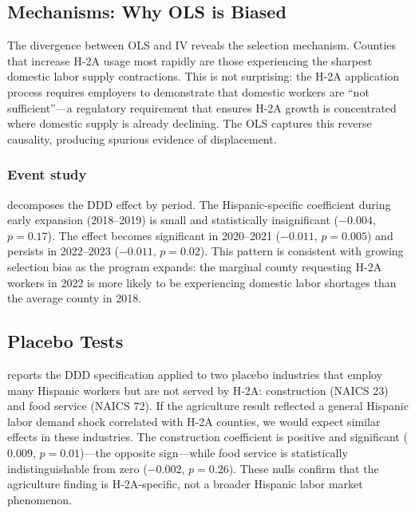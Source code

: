 \documentclass[12pt]{article}
\begin{document}


\subsection{Mechanisms: Why OLS is Biased}

The divergence between OLS and IV reveals the selection mechanism. Counties that increase H-2A usage most rapidly are those experiencing the sharpest domestic labor supply contractions. This is not surprising: the H-2A application process requires employers to demonstrate that domestic workers are ``not sufficient''---a regulatory requirement that ensures H-2A growth is concentrated where domestic supply is already declining. The OLS captures this reverse causality, producing spurious evidence of displacement.

\subsubsection*{Event study}  decomposes the DDD effect by period. The Hispanic-specific coefficient during early expansion (2018--2019) is small and statistically insignificant ($-0.004$, $p = 0.17$). The effect becomes significant in 2020--2021 ($-0.011$, $p = 0.005$) and persists in 2022--2023 ($-0.011$, $p = 0.02$). This pattern is consistent with growing selection bias as the program expands: the marginal county requesting H-2A workers in 2022 is more likely to be experiencing domestic labor shortages than the average county in 2018.



\subsection{Placebo Tests}

 reports the DDD specification applied to two placebo industries that employ many Hispanic workers but are not served by H-2A: construction (NAICS 23) and food service (NAICS 72). If the agriculture result reflected a general Hispanic labor demand shock correlated with H-2A counties, we would expect similar effects in these industries. The construction coefficient is positive and significant ($0.009$, $p = 0.01$)---the opposite sign---while food service is statistically indistinguishable from zero ($-0.002$, $p = 0.26$). These nulls confirm that the agriculture finding is H-2A-specific, not a broader Hispanic labor market phenomenon.
\end{document}
